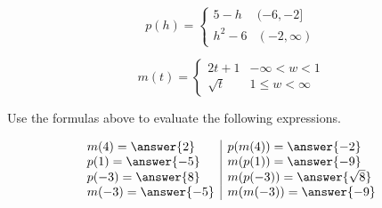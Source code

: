 \documentclass{ximera}
\author{Lee Wayand}
\begin{document}
\begin{exercise}





\[
p(h) = 
\begin{cases}
  5 - h &  (-6, -2]   \\
  h^2 - 6 & (-2, \infty)
\end{cases}
\]





\[
m(t) = 
\begin{cases}
  2t + 1 &   -\infty < w < 1 \\
  \sqrt{t} &  1 \leq w < \infty
\end{cases}
\]




\begin{question}


Use the formulas above to evaluate the following expressions.



\[
\begin{array}{l|l}
m(4) = \answer{2}  & p(m(4)) = \answer{-2}   \\
p(1) = \answer{-5}  & m(p(1)) = \answer{-9}   \\
p(-3) = \answer{8}  & m(p(-3)) = \answer{\sqrt{8}}   \\
m(-3) = \answer{-5}  & m(m(-3)) = \answer{-9}   
\end{array}
\]



\end{question}















\end{exercise}
\end{document}
